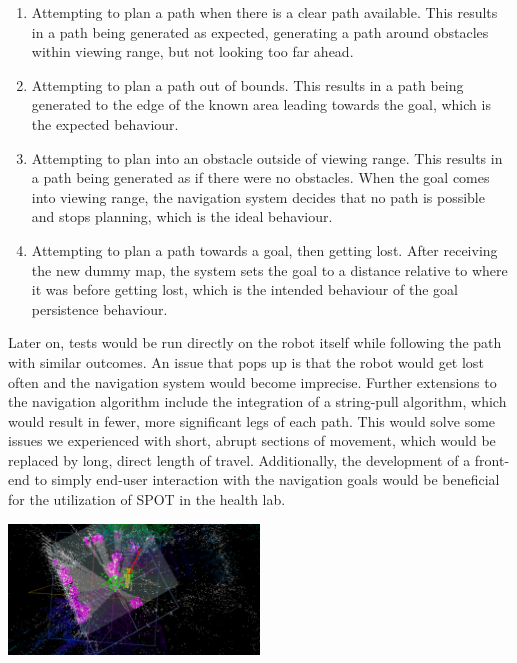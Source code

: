 \documentclass[10pt,english]{article}
\begin{document}
\begin{enumerate}[noitemsep]
    \item Attempting to plan a path when there is a clear path available. This results in a path being generated as expected, generating a path around obstacles within viewing range, but not looking too far ahead. %
    \item Attempting to plan a path out of bounds. This results in a path being generated to the edge of the known area leading towards the goal, which is the expected behaviour.
    \item Attempting to plan into an obstacle outside of viewing range. This results in a path being generated as if there were no obstacles. When the goal comes into viewing range, the navigation system decides that no path is possible and stops planning, which is the ideal behaviour.
    \item Attempting to plan a path towards a goal, then getting lost. After receiving the new dummy map, the system sets the goal to a distance relative to where it was before getting lost, which is the intended behaviour of the goal persistence behaviour.
\end{enumerate}

Later on, tests would be run directly on the robot itself while following the path with similar outcomes. An issue that pops up is that the robot would get lost often and the navigation system would become imprecise. Further extensions to the navigation algorithm include the integration of a string-pull algorithm, which would result in fewer, more significant legs of each path. This would solve some issues we experienced with short, abrupt sections of movement, which would be replaced by long, direct length of travel. Additionally, the development of a front-end to simply end-user interaction with the navigation goals would be beneficial for the utilization of SPOT in the health lab.

\vspace*{\fill}
\begin{center}
\includegraphics[width=0.5\textwidth]{images/Path1.png}
\linebreak
\linebreak
{}
\end{center}
\vfill
\thispagestyle{empty}
\end{document}
